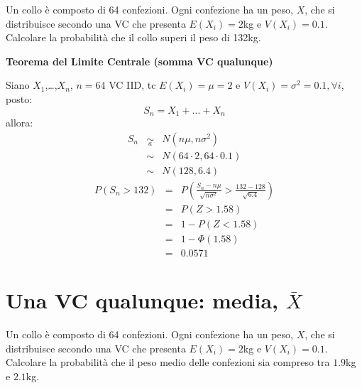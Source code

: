 \documentclass[
  11pt,
]{book}
\theoremstyle{mytheoremstyle}
\theoremstyle{mydefstyle}
\newenvironment{sol}
  {
  \begin{tcolorbox}[enhanced,breakable,arc=0.1mm,boxrule=1pt,colback=white,colframe=iblue,
  title=\bf \fontfamily{lmss}\selectfont \hspace{.5 cm} Soluzione,drop fuzzy shadow]

}{
\end{tcolorbox}
  }
\begin{document}
Un collo è composto di 64 confezioni. Ogni confezione ha un peso, \(X\),
che si distribuisce secondo una VC che presenta \(E(X_{i})= 2\)kg e
\(V(X_{i})=0.1\). Calcolare la probabilità che il collo superi il peso di
132kg.

\begin{sol}

\textbf{Teorema del Limite Centrale (somma VC qualunque)}

Siano \(X_1\),\ldots,\(X_n\), \(n=64\) VC IID, tc \(E(X_i)=\mu=2\) e \(V(X_i)=\sigma^2=0.1,\forall i\), posto:
\[
      S_n = X_1 + ... + X_n
      \]
allora:\begin{eqnarray*}
  S_n & \mathop{\sim}\limits_{a}& N(n\mu,n\sigma^2) \\
     &\sim & N(64\cdot2,64\cdot0.1) \\
     &\sim & N(128,6.4) 
  \end{eqnarray*}\begin{eqnarray*}
      P( S_n   >   132 ) 
        &=& P\left(  \frac { S_n  -  n\mu }{ \sqrt{n\sigma^2} }  >  \frac { 132  -  128 }{\sqrt{ 6.4 }} \right)  \\
                 &=& P\left(  Z   >   1.58 \right) \\    &=& 1-P(Z< 1.58 )\\ 
                 &=&  1-\Phi( 1.58 ) \\ &=&  0.0571 
      \end{eqnarray*}

\end{sol}

\section{\texorpdfstring{Una VC qualunque: media, \(\bar{X}\)}{Una VC qualunque: media, \textbackslash bar\{X\}}}\label{una-vc-qualunque-media-barx}

Un collo è composto di 64 confezioni. Ogni confezione ha un peso, \(X\),
che si distribuisce secondo una VC che presenta \(E(X_{i})= 2\)kg e
\(V(X_{i})=0.1\). Calcolare la probabilità che il peso medio delle
confezioni sia compreso tra \(1.9\)kg e \(2.1\)kg.
\end{document}
